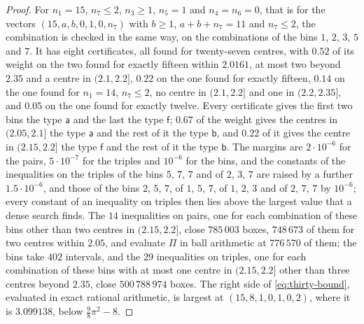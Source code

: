 \documentclass[11pt,reqno]{amsart}
\renewcommand{\_}{\origunderscore\allowbreak}
\numberwithin{equation}{section}
\theoremstyle{plain}
\theoremstyle{definition}
\theoremstyle{remark}
\begin{document}
\begin{proof}
For $n_1=15$, $n_7\le2$, $n_3\ge1$, $n_5=1$ and $n_4=n_6=0$, that is
for the vectors $(15,a,b,0,1,0,n_7)$ with $b\ge1$, $a+b+n_7=11$ and
$n_7\le2$, the combination is checked in the same way, on the
combinations of the bins $1$, $2$, $3$, $5$ and $7$. It has eight
certificates, all found for twenty-seven centres, with $0.52$ of its
weight on the two found for exactly fifteen within $2.0161$, at most two
beyond $2.35$ and a centre in $(2.1,2.2]$, $0.22$ on the one found for
exactly fifteen, $0.14$ on the one found for $n_1=14$, $n_7\le2$, no
centre in $(2.1,2.2]$ and one in $(2.2,2.35]$, and $0.05$ on the one
found for exactly twelve. Every certificate gives the first two bins the
type $\mathsf a$ and the last the type $\mathsf f$; $0.67$ of the weight
gives the centres in $(2.05,2.1]$ the type $\mathsf a$ and the rest of it
the type $\mathsf b$, and $0.22$ of it gives the centre in $(2.15,2.2]$
the type $\mathsf f$ and the rest of it the type $\mathsf b$. The
margins are $2\cdot10^{-6}$ for the pairs, $5\cdot10^{-7}$ for the
triples and $10^{-6}$ for the bins, and the constants of the inequalities
on the triples of the bins $5$, $7$, $7$ and of $2$, $3$, $7$ are raised
by a further $1.5\cdot10^{-6}$, and those of the bins $2$, $5$, $7$, of
$1$, $5$, $7$, of $1$, $2$, $3$ and of $2$, $7$, $7$ by $10^{-6}$; every
constant of an inequality on triples then lies above the largest value
that a dense search finds. The $14$ inequalities on pairs, one for each
combination of these bins other than two centres in $(2.15,2.2]$, close
$785\,003$ boxes, $748\,673$ of them for two centres within $2.05$, and
evaluate $\Pi$ in ball arithmetic at $776\,570$ of them; the bins take
$402$ intervals, and the $29$ inequalities on triples, one for each
combination of these bins with at most one centre in $(2.15,2.2]$ other
than three centres beyond $2.35$, close $500\,788\,974$ boxes. The right
side of \eqref{eq:thirty-bound}, evaluated in exact rational arithmetic,
is largest at $(15,8,1,0,1,0,2)$, where it is $3.099138$, below
$\frac98\pi^2-8$.


\end{proof}
\end{document}
